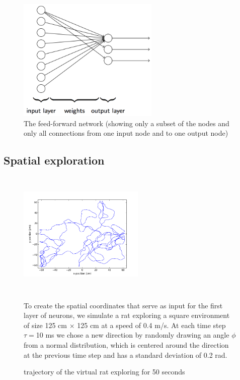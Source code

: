 \documentclass[a4paper, 12pt]{article}
\begin{document}
\begin{center}
\begin{figure}\label{overview}
\begin{center}
\includegraphics[width=0.6\textwidth]{pics/model_overview.png}
\footnotesize{\caption{The feed-forward network (showing only a subset of the nodes and only all connections from one input node and to one output node)}}
\end{center}
\end{figure}
\end{center}

\subsection{Spatial exploration}
\begin{figure}[h]
\begin{minipage}{0.4\textwidth}
	\includegraphics[width=6cm, height=6cm]{pics/running_rat.png}
	\footnotesize{\caption{trajectory of the virtual rat exploring for 50 seconds}}
\end{minipage}
\begin{minipage}{0.6\textwidth}
To create the spatial coordinates that serve as input for the first layer of neurons, we simulate a rat exploring a square environment of size 125 cm $\times$ 125 cm at a speed of 0.4 m/s. At each time step $\tau=$10 ms we chose a new direction by randomly drawing an angle $\phi$ from a normal distribution, which is centered around the direction at the previous time step and has a standard deviation of 0.2 rad.   
\end{minipage}
\end{figure}
\end{document}
